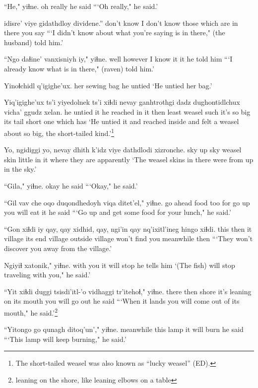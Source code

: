 \documentclass[12pt]{article}
\begin{document}
\gll ``He," yiɬne.
{oh really} {he said}
\glt ```Oh really," he said.'
\glend

 idisre' {viye gidathdloy} dividene.'' 
{don't know} {I don't know} {those which are in there} {you say} 
\glt ```I didn't know about what you're saying is in there," (the husband) told him.'
\glend

\gll ``Ngo daɬine' vanxisniyh iy," yiɬne.
well however {I know it} it {he told him}
\glt ```I already know what is in there," (raven) told him.'
\glend

\gll Yinoɬchidl q'igighe'ux.
{her sewing bag} {he untied}
\glt `He untied her bag.'
\glend

\gll Yiq'igighe'ux ts'i yiyedolnek ts'i xiɬdi {nevay ganhtrothgi} dadz dughontidlchux vicha' ggudz xelan. 
{he untied it} {} {he reached in it} {} then {least weasel} such {it's so big} {its tail} short {one which has}
\glt `He untied it and reached inside and felt a weasel about so big, the short-tailed kind.'\footnote{The short-tailed weasel was also known as ``lucky weasel'' (ED).}
\glend

\gll Yo, ngidiggi yo, nevay dhith k'idz viye dathdlodi xizronche.
sky up sky weasel skin little {in it} {where they are} apparently
\glt `The weasel skins in there were from up in the sky.'
\glend

\gll ``Gila," yiɬne.
{okay} {he said}
\glt ```Okay," he said.'
\glend

\gll ``Gil vav che oqo duqondhedoyh {viqa ditet'el,"} yiɬne.
{go ahead} food too for {go up} {you will eat it} {he said}
\glt ```Go up and get some food for your lunch," he said.'
\glend

\gll ``Gon xiɬdi iy {qay, qay} xidhid, qay, ngi'in qay nq'ixitl'ineg hingo xiɬdi. 
this then it village {its end} village outside village {won't find you} meanwhile then 
\glt ```They won't discover you away from the village.'
\glend

\gll Ngiyiɬ xatonik," yiɬne.
{with you} {it will stop} {he tells him}
\glt  `(The fish) will stop traveling with you," he said.'
\glend

\gll ``Yit xiɬdi duggi tsisdi'itl-'o vidhaggi tr'itehoɬ," yiɬne.
there then shore {it's leaning on}  {its mouth} {you will go out} {he said}
\glt ```When it lands you will come out of its mouth," he said.'\footnote{leaning on the shore, like leaning elbows on a table}
\glend

\gll ``Yitongo go qunagh ditoq'un'," yiɬne.
meanwhile this lamp {it will burn} {he said}
\glt ```This lamp will keep burning," he said.'
\glend
\end{document}

